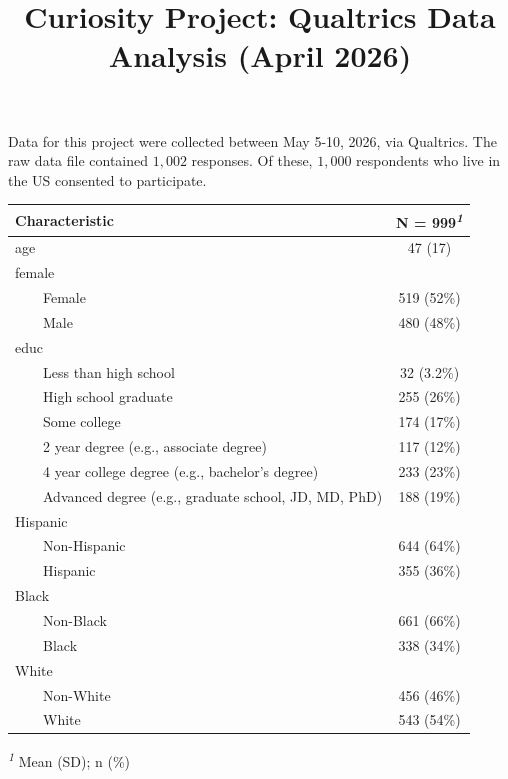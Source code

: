 \documentclass[
  letterpaper,
  DIV=11,
  numbers=noendperiod]{scrartcl}
\title{Curiosity Project: Qualtrics Data Analysis (April 2026)}
\author{}
\date{}
\renewcommand*\contentsname{Table of contents}
\newcommand\contentsname{Table of contents}
\begin{document}
\maketitle
{}

\ifdefined\Shaded\renewenvironment{Shaded}{\begin{tcolorbox}[sharp corners, borderline west={3pt}{0pt}{shadecolor}, boxrule=0pt, interior hidden, enhanced, frame hidden, breakable]}{\end{tcolorbox}}\fi

\renewcommand*\contentsname{Table of contents}
{
\hypersetup{linkcolor=}
\setcounter{tocdepth}{3}
\tableofcontents
}
Data for this project were collected between May 5-10, 2026, via
Qualtrics. The raw data file contained \(1,002\) responses. Of these,
\(1,000\) respondents who live in the US consented to participate.

\begin{table}
\fontsize{12.0pt}{14.0pt}\selectfont
\begin{tabular*}{\linewidth}{@{\extracolsep{\fill}}lc}
\toprule
\textbf{Characteristic} & \textbf{N = 999}\textsuperscript{\textit{1}} \\ 
\midrule\addlinespace[2.5pt]
age & 47 (17) \\ 
female &  \\ 
    Female & 519 (52\%) \\ 
    Male & 480 (48\%) \\ 
educ &  \\ 
    Less than high school & 32 (3.2\%) \\ 
    High school graduate & 255 (26\%) \\ 
    Some college & 174 (17\%) \\ 
    2 year degree (e.g., associate degree) & 117 (12\%) \\ 
    4 year college degree (e.g., bachelor's degree) & 233 (23\%) \\ 
    Advanced degree (e.g., graduate school, JD, MD, PhD) & 188 (19\%) \\ 
Hispanic &  \\ 
    Non-Hispanic & 644 (64\%) \\ 
    Hispanic & 355 (36\%) \\ 
Black &  \\ 
    Non-Black & 661 (66\%) \\ 
    Black & 338 (34\%) \\ 
White &  \\ 
    Non-White & 456 (46\%) \\ 
    White & 543 (54\%) \\ 
\bottomrule
\end{tabular*}
\begin{minipage}{\linewidth}
\vspace{.05em}
\textsuperscript{\textit{1}} Mean (SD); n (\%)\\
\end{minipage}
\end{table}
\end{document}
